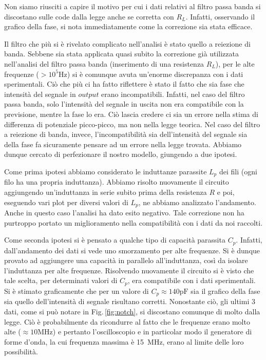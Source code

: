 Non siamo riusciti a capire il motivo per cui i dati relativi al filtro passa banda si discostano sulle code dalla legge anche se corretta con $R_L$. Infatti, osservando il grafico della fase, si nota immediatamente come la correzione sia stata efficace.

Il filtro che più si è rivelato complicato nell'analisi è stato quello a reiezione di banda. Sebbene sia stata applicata quasi subito la correzione già utilizzata nell'analisi del filtro passa banda (inserimento di una resistenza $R_L$), per le alte frequenze ($>10^5 \si{\hertz}$) si è comunque avuta un'enorme discrepanza con i dati sperimentali. Ciò che più ci ha fatto riflettere è stato il fatto che sia fase che intensità del segnale in $output$ erano incompatibili. Infatti, nel caso del filtro passa banda, solo l'intensità del segnale in uscita non era compatibile con la previsione, mentre la fase lo era. Ciò lascia credere ci sia un errore nella stima di differenza di potenziale picco-picco, ma non nella legge teorica. Nel caso del filtro a reiezione di banda, invece, l'incompatibilità sia dell'intensità del segnale sia della fase fa sicuramente pensare ad un errore nella legge trovata. Abbiamo dunque cercato di perfezionare il nostro modello, giungendo a due ipotesi.

Come prima ipotesi abbiamo considerato le induttanze parassite $L_p$ dei fili (ogni filo ha una propria induttanza). Abbiamo risolto nuovamente il circuito aggiungendo un'induttanza in serie subito prima della resistenza $R$ e poi, eseguendo vari plot per diversi valori di $L_p$, ne abbiamo analizzato l'andamento. Anche in questo caso l'analisi ha dato esito negativo. Tale correzione non ha purtroppo portato un miglioramento nella compatibilità con i dati da noi raccolti.

Come seconda ipotesi si è pensato a qualche tipo di capacità parassita $C_p$. Infatti, dall'andamento dei dati si vede uno smorzamento per alte frequenze. Si è dunque provato ad aggiungere una capacità in parallelo all'induttanza, così da isolare l'induttanza per alte frequenze. Risolvendo nuovamente il circuito si è visto che tale scelta, per determinati valori di $C_p$, era compatibile con i dati sperimentali. Si è stimato graficamente che per un valore di $C_p \approx 140 \si{\pico\farad}$ sia il grafico della fase sia quello dell'intensità di segnale risultano corretti. Nonostante ciò, gli ultimi 3 dati, come si può notare in Fig.$\,$\ref{fig:notch}, si discostano comunque di molto dalla legge. Ciò è probabilmente da ricondurre al fatto che le frequenze erano molto alte ($\approx 10 \si{\mega\hertz}$) e pertanto l'oscilloscopio e in particolar modo il generatore di forme d'onda, la cui frequenza massima è \SI{15}{\mega\hertz}, erano al limite delle loro possibilità.

